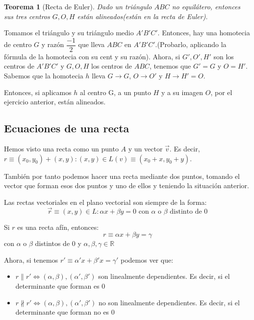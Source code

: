 \documentclass[11pt, a4paper]{article}
\makeatletter
\newif\IfInSansMode
\let\oldsf\sffamily
\renewcommand*{\sffamily}{\oldsf\mathversion{sans}\InSansModetrue}
\let\oldnorm\normalfont
\renewcommand*{\normalfont}{\oldnorm\InSansModefalse\mathversion{normal}}
\renewenvironment{proof}[1][\proofname] {\vspace{-15pt}\par\pushQED{\qed}\normalfont\topsep6\p@\@plus6\p@\relax\trivlist\item[\hskip\labelsep\it#1\@addpunct{.}]\ignorespaces}{\popQED\endtrivlist\@endpefalse}
\newcommand{\R}{\mathbb{R}}
\renewcommand{\vec}{\overrightarrow}
\renewenvironment{proof}[1][\proofname] {\par\pushQED{\qed}\normalfont\topsep6\p@\@plus6\p@\relax\trivlist\item[\hskip\labelsep\itshape\sffamily#1\@addpunct{.}]\ignorespaces}{\popQED\endtrivlist\@endpefalse}
\theoremstyle{theorem-style}
\newtheorem{nth}{Teorema}[section]
\theoremstyle{definition-style}
\theoremstyle{remark-style}
\theoremstyle{example-style}
\makeatother
\begin{document}
\begin{nth}[Recta de Euler]
  Dado un triángulo $ABC$ no equilátero, entonces sus tres centros $G,O,H$ están alineados(están en la recta de Euler).
\end{nth}
\begin{proof}
  Tomamos el triángulo y su triángulo medio $A'B'C'$. Entonces, hay una homotecia de centro $G$ y razón $\dfrac{-1}{2}$ que lleva $ABC$ en $A'B'C'$.(Probarlo, aplicando la fórmula de la homotecia con su cent y su razón). 
  Ahora, si $G',O',H'$ son los centros de $A'B'C'$ y $G,O,H$ los centros de $ABC$, tenemos que $G'=G$ y $O=H'$. Sabemos que la homotecia $h$ lleva $G \to G$, $O \to O'$ y $H \to H' = O$.
  
  Entonces, si aplicamos $h$ al centro G, a un punto $H$ y a su imagen $O$, por el ejercicio anterior, están alineados.
  
\end{proof}



\subsection{Ecuaciones de una recta}
Hemos visto una recta como un punto $A$ y un vector $\vec{v}$. Es decir, $r \equiv (x_0,y_0) +(x,y) : (x,y) \in L(v) \equiv (x_0+x,y_0+y) $.

También por tanto podemos hacer una recta mediante dos puntos, tomando el vector que forman esos dos puntos y uno de ellos y teniendo la situación anterior.

Las rectas vectoriales en el plano vectorial son siempre de la forma:
\[
  \vec{r} \equiv (x,y) \in L : \alpha x + \beta y = 0 \text{  con $\alpha$ o $\beta$ distinto de 0}
\]

Si $r$ es una recta afín, entonces:
\[
  r \equiv \alpha x + \beta y = \gamma
\] con $\alpha$ o $\beta$ distintos de $0$ y $\alpha,\beta,\gamma \in \R$

Ahora, si tenemos $r'\equiv \alpha' x + \beta' x = \gamma '$ podemos ver que:
\begin{itemize}
\item $r \parallel r' \iff (\alpha,\beta), (\alpha',\beta') $ son linealmente dependientes. Es decir, si el determinante que forman es $0$

\item $r \nparallel r'\iff (\alpha,\beta), (\alpha',\beta') $ no son linealmente dependientes. Es decir, si el determinante que forman no es $0$
\end{itemize}
\end{document}
